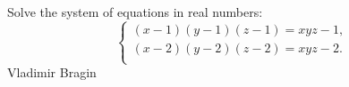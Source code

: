 Solve the system of equations in real numbers:\[

\begin{cases*}

(x - 1)(y - 1)(z - 1) = xyz - 1,\\

(x - 2)(y - 2)(z - 2) = xyz - 2.\\

\end{cases*}

\]Vladimir Bragin